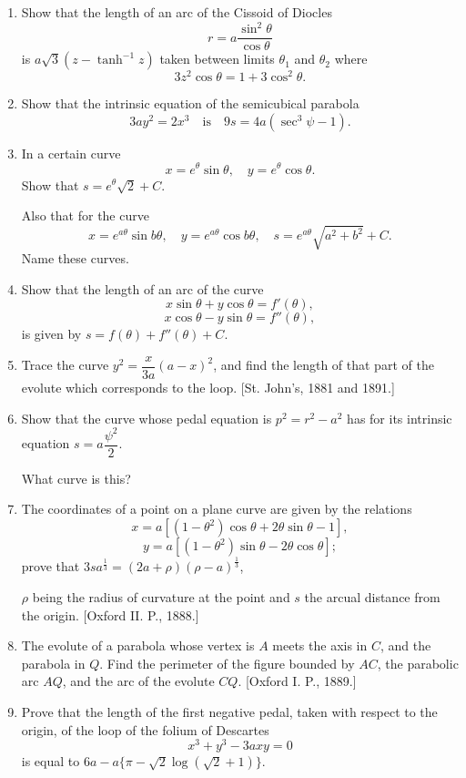 \documentclass[11pt, a4paper]{article}
\newcommand{\source}[1]{\hfill\textnormal{[#1]}}
\begin{document}
\begin{enumerate}[leftmargin=2em]
\item Show that the length of an arc of the Cissoid of Diocles
\[
r=a\frac{\sin^2\theta}{\cos\theta}
\]
is $a\sqrt3(z-\tanh^{-1}z)$ taken between limits $\theta_1$ and $\theta_2$ where
\[
3z^2\cos\theta=1+3\cos^2\theta.
\]

\item Show that the intrinsic equation of the semicubical parabola
\[
3ay^2=2x^3\quad\text{is}\quad9s=4a(\sec^3\psi-1).
\]

\item In a certain curve
\[
x=e^\theta\sin\theta,\quad y=e^\theta\cos\theta.
\]
Show that $s=e^\theta\sqrt2+C$.

Also that for the curve
\[
x=e^{a\theta}\sin b\theta,\quad y=e^{a\theta}\cos b\theta,\quad s=e^{a\theta}\sqrt{a^2+b^2}+C.
\]
Name these curves.

\item Show that the length of an arc of the curve
\[
x\sin\theta+y\cos\theta=f'(\theta),
\]
\[
x\cos\theta-y\sin\theta=f''(\theta),
\]
is given by $s=f(\theta)+f''(\theta)+C$.

\item Trace the curve $y^2=\dfrac{x}{3a}(a-x)^2$, and find the length of that part of the evolute which corresponds to the loop. \source{St. John's, 1881 and 1891.}

\item Show that the curve whose pedal equation is $p^2=r^2-a^2$ has for its intrinsic equation $s=a\dfrac{\psi^2}{2}$.

What curve is this?

\item The coordinates of a point on a plane curve are given by the relations
\[
x=a[(1-\theta^2)\cos\theta+2\theta\sin\theta-1],
\]
\[
y=a[(1-\theta^2)\sin\theta-2\theta\cos\theta];
\]
prove that $3sa^{\frac13}=(2a+\rho)(\rho-a)^{\frac13}$,

$\rho$ being the radius of curvature at the point and $s$ the arcual distance from the origin. \source{Oxford II. P., 1888.}

\item The evolute of a parabola whose vertex is $A$ meets the axis in $C$, and the parabola in $Q$. Find the perimeter of the figure bounded by $AC$, the parabolic arc $AQ$, and the arc of the evolute $CQ$. \source{Oxford I. P., 1889.}

\item Prove that the length of the first negative pedal, taken with respect to the origin, of the loop of the folium of Descartes
\[
x^3+y^3-3axy=0
\]
is equal to $6a-a\{\pi-\sqrt2\log(\sqrt2+1)\}$.


\end{enumerate}
\end{document}
